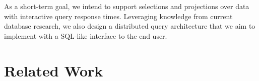 \documentclass[11pt]{article}
\begin{document}
As a short-term goal, we intend to support selections and projections
over data with interactive query response times. Leveraging knowledge from
current database research, we also design a distributed query architecture
that we aim to implement with a SQL-like interface to the end user.


\section{Related Work}
\end{document}
